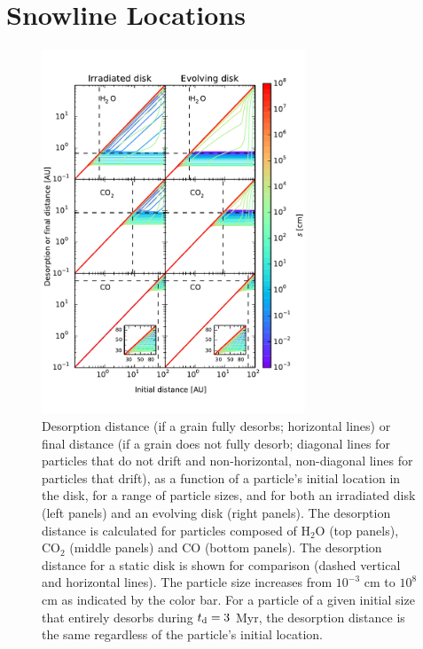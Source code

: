 \documentclass[apj]{emulateapj}
\begin{document}
\section{Snowline Locations}
\label{sec:snowlines}

\begin{figure}[tb]
\centering
\includegraphics[width=0.7\textwidth]{desorption_distance_passive_active_colorbar_test2.pdf}
\caption{Desorption distance (if a grain fully desorbs; horizontal lines) or final distance (if a grain does not fully desorb; diagonal lines for particles that do not drift and non-horizontal, non-diagonal lines for particles that drift), as a function of a particle's initial location in the disk, for a range of particle sizes, and for both an irradiated disk (left panels) and an evolving disk (right panels). The desorption distance is calculated for particles composed of H$_2$O (top panels), CO$_2$ (middle panels) and CO (bottom panels). The desorption distance for a static disk is shown for comparison (dashed vertical and horizontal lines). The particle size increases from $10^{-3}$ cm to $10^8$ cm as indicated by the color bar. For a particle of a given initial size that entirely desorbs during $t_{\rm d}=3$ Myr, the desorption distance is the same regardless of the particle's initial location.} 
\label{fig:snowlines}
\end{figure}
\end{document}
